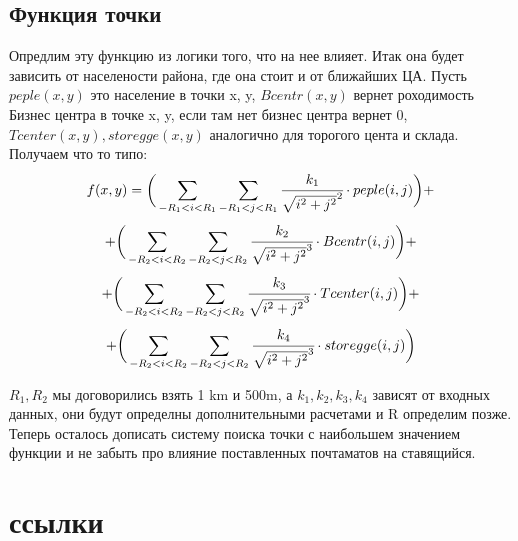 \documentclass[12pt]{article} %
\begin{document}
 	\subsection{Функция точки}
 	\hspace*{1cm}Опредлим эту функцию из логики того, что на нее влияет. Итак она будет зависить от населености района, где она стоит и от ближайших ЦА. Пусть $peple(x,y)$ это население в точки x, y, $Bcentr(x,y)$ вернет роходимость Бизнес центра в точке x, y, если там нет бизнес центра вернет 0, $Tcenter(x, y), storegge(x,y)$ аналогично для торогого цента и склада. Получаем что то типо:
 	\[f(x, y)= \bigg(\sum_{-R_1<i<R_1}\sum_{-R_1<j<R_1}\cfrac{k_1}{\sqrt{i^2 + j^2}^2}\cdot peple(i,j)\bigg) +\]
 	\[+\bigg( \sum_{-R_2<i<R_2}\sum_{-R_2<j<R_2}\cfrac{k_2}{\sqrt{i^2 + j^2}^3} \cdot Bcentr(i,j) \bigg)+ \]
 	\[+\bigg( \sum_{-R_2<i<R_2}\sum_{-R_2<j<R_2}\cfrac{k_3}{\sqrt{i^2 + j^2}^3} \cdot Tcenter(i,j) \bigg) +\]
 	\[+ \bigg( \sum_{-R_2<i<R_2}\sum_{-R_2<j<R_2}\cfrac{k_4}{\sqrt{i^2 + j^2}^3} \cdot storegge(i,j) \bigg)\] 
 	\par $R_1, R_2$ мы договорились взять 1 km и 500m, а $k_1, k_2, k_3,k_4$ зависят от входных данных, они будут определны дополнительными расчетами и R определим позже. 
    \hspace*{1cm}Теперь осталось дописать систему поиска точки с наибольшем значением функции и не забыть про влияние поставленных почтаматов на ставящийся.
    \section{ссылки}\label{Referenses}
 
\end{document}
